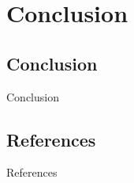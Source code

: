 \documentclass{bredelebeamer}
\begin{document}
\section{Conclusion}
\subsection{Conclusion}
\begin{frame}{Conclusion}{}

\end{frame}
\subsection{References}
\begin{frame}{References}{}

\end{frame}
\end{document}
